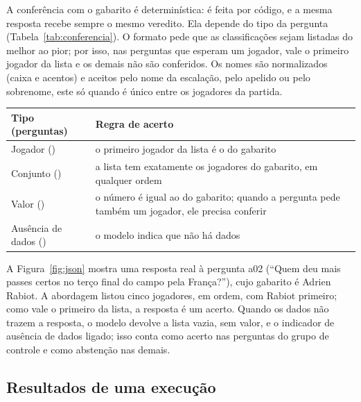 A conferência com o gabarito é determinística: é feita por código, e a mesma resposta recebe sempre o mesmo
veredito. Ela depende do tipo da pergunta (Tabela~\ref{tab:conferencia}). O formato pede que as classificações sejam
listadas do melhor ao pior; por isso, nas perguntas que esperam um jogador, vale o primeiro jogador da lista e os
demais não são conferidos. Os nomes são normalizados (caixa e acentos) e aceitos pelo nome da escalação, pelo
apelido ou pelo sobrenome, este só quando é único entre os jogadores da partida.

\vspace{2mm}
\noindent\begin{minipage}{\columnwidth}
\centering\small\renewcommand{\arraystretch}{1.15}
\begin{tabular}{>{\raggedright\arraybackslash}p{}>{\raggedright\arraybackslash}p{}} %
\toprule
Tipo (perguntas) & Regra de acerto \\
\midrule
Jogador (\nCheckPlayer{}) & o primeiro jogador da lista é o do gabarito \\
Conjunto (\nCheckSet{}) & a lista tem exatamente os jogadores do gabarito, em qualquer ordem \\
Valor (\nCheckValue{}) & o número é igual ao do gabarito; quando a pergunta pede também um jogador, ele precisa conferir \\
Ausência de dados (\nCheckNoData{}) & o modelo indica que não há dados \\
\bottomrule
\end{tabular}
\label{tab:conferencia}
\end{minipage}\par\smallskip

A Figura~\ref{fig:json} mostra uma resposta real à pergunta a02 (``Quem deu mais passes certos no terço final do
campo pela França?''), cujo gabarito é Adrien Rabiot. A abordagem \armGraphTools{} listou cinco jogadores, em
ordem, com Rabiot primeiro; como vale o primeiro da lista, a resposta é um acerto. Quando os dados não trazem a
resposta, o modelo devolve a lista vazia, sem valor, e o indicador de ausência de dados ligado; isso conta como
acerto nas perguntas do grupo de controle e como abstenção nas demais.




\subsection{Resultados de uma execução}\label{sec:execucao}

